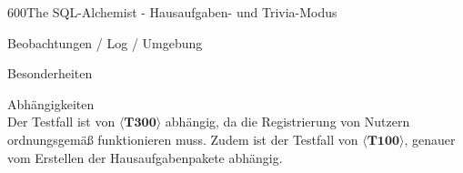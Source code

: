 \begin{testcase}{600}{The SQL-Alchemist - Hausaufgaben- und Trivia-Modus}
\item[Beobachtungen / Log / Umgebung]~\\

\item[Besonderheiten]~\\

\item[Abhängigkeiten]~\\
Der Testfall ist von $\langle\textbf{T300}\rangle$ abhängig, da die Registrierung von Nutzern ordnungsgemäß funktionieren muss. Zudem ist der Testfall von $\langle\textbf{T100}\rangle$, genauer vom Erstellen der Hausaufgabenpakete abhängig. 

\end{testcase}


